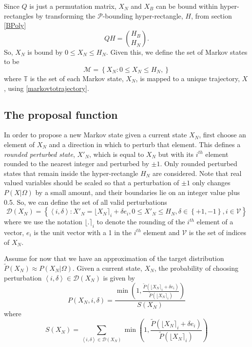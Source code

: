 \documentclass{article}
\begin{document}
Since $Q$ is just a permutation matrix, $X_N$ and $X_B$ can be bound within hyper-rectangles by transforming the $\mathcal{P}$-bounding hyper-rectangle, $H$, from section \ref{BPoly}
\[
QH = {H_B \choose H_N}.
\]
So, $X_N$ is bound by $0 \le X_N \le H_N$. Given this, we define the set of Markov states to be
\[
\mathcal{M} = \left\{ X_N: 0 \le X_N \le H_N, \right\}
\]
where $\mathbb{T}$ is the set of  each Markov state, $X_N$, is mapped to a unique trajectory, $X$, using \eqref{markovtotrajectory}.


\subsection{The proposal function}
\label{theProposalFunction}
In order to propose a new Markov state given a current state $X_N$, first choose an element of $X_N$ and a direction in which to perturb that element. This defines a \textit{rounded perturbed state}, $X'_N$,  which is equal to $X_N$ but with its $i^{th}$ element rounded to the nearest integer and perturbed by $\pm 1$. Only rounded perturbed states that remain inside the hyper-rectangle $H_N$ are considered. Note that real valued variables should be scaled so that a perturbation of $\pm 1$ only changes $P(X|\Omega)$ by a small amount, and their boundaries lie on an integer value plus 0.5. So, we can define the set of all valid perturbations
\[
\mathcal{D}(X_N) = \left\{\left<i,\delta\right> : X'_N = \lfloor X_N \rceil_i + \delta e_i, 0 \le X'_N \le H_N, \delta \in \left\{+1,-1\right\}, i \in \mathcal{V} \right\}
\]
where we use the notation $\lfloor . \rceil_i$ to denote the rounding of the $i^{th}$ element of a vector, $e_i$ is the unit vector with a 1 in the $i^{th}$ element and $\mathcal{V}$ is the set of indices of $X_N$.

Assume for now that we have an approximation of the target distribution $\tilde{P}(X_N) \approx P(X_N|\Omega)$. Given a current state, $X_N$, the probability of choosing perturbation $\left<i,\delta\right> \in \mathcal{D}(X_N)$ is given by
\begin{equation}
P(X_N,i,\delta) = \frac{\min\left(1, \frac{\tilde{P}(\lfloor X_N \rceil_i + \delta e_i)}{\tilde{P}(\lfloor X_N \rceil_i)}\right)}{S(X_N)} 
\label{transitionProb}
\end{equation}
where
\begin{equation}
S(X_N) = \sum_{\left<i,\delta\right> \in \mathcal{D}(X_N)} \min\left(1, \frac{\tilde{P}(\lfloor X_N \rceil_i + \delta e_i)}{\tilde{P}(\lfloor X_N \rceil_i)}\right)
\label{transitionSum}
\end{equation}
\end{document}
